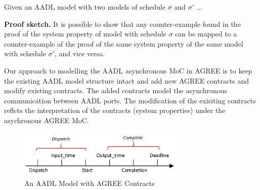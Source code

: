\begin{theorem}
Given an AADL model with two models of schedule $\sigma$ and $\sigma'$ ...
\end{theorem}

{\bf Proof sketch.} It is possible to show that any counter-example found in the proof of the system property of model with schedule $\sigma$ can be mapped to a counter-example of the proof of the same system property of the same model with schedule $\sigma'$,  and vice versa.




Our approach to modelling the AADL asynchronous MoC in AGREE is to keep the existing AADL model structure intact and add new AGREE contracts and modify existing contracts. The added contracts model the asynchronous communication between AADL ports. The modification of the exisiting contracts reflcts the interpretation of the contracts (system properties) under the asychronous AGREE MoC. 


\begin{figure}[ht!]
\centering
\includegraphics[width=80mm]{aadl_events.jpg}
\caption{An AADL Model with AGREE Contracts\label{motivation}}
\end{figure}

